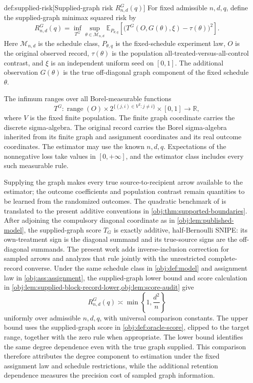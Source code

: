 \documentclass[11pt]{article}
\begin{document}
\begin{definitionv}{def:supplied-risk}[Supplied-graph risk $R^G_{n,d}(q)$]
For fixed admissible \(n,d,q\), define the supplied-graph minimax squared risk by
\[
R^G_{n,d}(q)=
\inf_{T^G}\sup_{\theta\in\mathcal M_{n,d}}
\mathbb E_{P_{\theta,q}}
\left[
\bigl(T^G(O,G(\theta),\xi)-\tau(\theta)\bigr)^2
\right].
\]
Here \(\mathcal M_{n,d}\) is the schedule class, \(P_{\theta,q}\) is the fixed-schedule experiment law, \(O\) is the original observed record, \(\tau(\theta)\) is the population all-treated-versus-all-control contrast, and \(\xi\) is an independent uniform seed on \([0,1]\). The additional observation \(G(\theta)\) is the true off-diagonal graph component of the fixed schedule \(\theta\).

The infimum ranges over all Borel-measurable functions
\[
T^G:
\operatorname{range}(O)\times
2^{\{(j,i)\in V^2:j\ne i\}}\times[0,1]
\longrightarrow\mathbb R,
\]
where \(V\) is the fixed finite population. The finite graph coordinate carries the discrete sigma-algebra. The original record carries the Borel sigma-algebra inherited from its finite graph and assignment coordinates and its real outcome coordinates. The estimator may use the known \(n,d,q\). Expectations of the nonnegative loss take values in \([0,+\infty]\), and the estimator class includes every such measurable rule.
\end{definitionv}

Supplying the graph makes every true source-to-recipient arrow available to the estimator; the outcome coefficients and population contrast remain quantities to be learned from the randomized outcomes. The quadratic benchmark of \citet[Theorem \texttt{thm:degree-frontier}; non-archival research note]{CausalSmithKnownGraph2026} is translated to the present additive conventions in \cref{obj:thm:supported-boundaries}. After adjoining the compulsory diagonal coordinate as in \cref{obj:lem:published-model}, the supplied-graph score \(T_G\) is exactly additive, half-Bernoulli SNIPE: its own-treatment sign is the diagonal summand and its true-source signs are the off-diagonal summands. The present work adds inverse-inclusion correction for sampled arrows and analyzes that rule jointly with the unrestricted complete-record converse. Under the same schedule class in \cref{obj:def:model} and assignment law in \cref{obj:ass:assignment}, the supplied-graph lower bound and score calculation in \cref{obj:lem:supplied-block-record-lower,obj:lem:score-audit} give
\[
R^G_{n,d}(q)\asymp \min\left\{1,\frac{d^2}{n}\right\}
\]
uniformly over admissible \(n,d,q\), with universal comparison constants. The upper bound uses the supplied-graph score in \cref{obj:def:oracle-score}, clipped to the target range, together with the zero rule when appropriate. The lower bound identifies the same degree dependence even with the true graph supplied. This comparison therefore attributes the degree component to estimation under the fixed assignment law and schedule restrictions, while the additional retention dependence measures the precision cost of sampled graph information.
\end{document}
